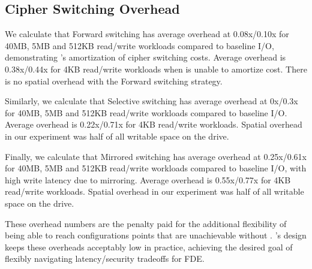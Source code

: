 \subsection{Cipher Switching Overhead}\label{subsec:3}

We calculate that Forward switching has average overhead at 0.08x/0.10x for
40MB, 5MB and 512KB read/write workloads compared to baseline I/O, demonstrating
\sys's amortization of cipher switching costs. Average overhead is\\0.38x/0.44x
for 4KB read/write workloads when \sys is unable to amortize cost. There is no
spatial overhead with the Forward switching strategy.

Similarly, we calculate that Selective switching has average overhead at 0x/0.3x
for 40MB, 5MB and 512KB read/write workloads compared to baseline I/O. Average
overhead is 0.22x/0.71x for 4KB read/write workloads. Spatial overhead in our
experiment was half of all writable space on the drive.

Finally, we calculate that Mirrored switching has average overhead at
0.25x/0.61x for 40MB, 5MB and 512KB read/write workloads compared to baseline
I/O, with high write latency due to mirroring. Average overhead is 0.55x/0.77x
for 4KB read/write workloads. Spatial overhead in our experiment was half of all
writable space on the drive.

These overhead numbers are the penalty paid for the additional flexibility of
being able to reach configurations points that are unachievable without \sys.
\sys's design keeps these overheads acceptably low in practice, achieving the
desired goal of flexibly navigating latency/security tradeoffs for FDE.
